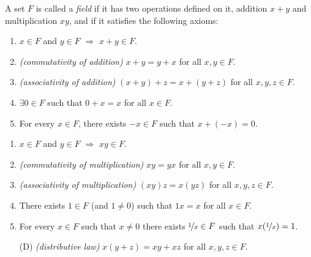 \documentclass[10pt,aspectratio=149]{beamer}
\begin{document}
\begin{frame}

\begin{definition}
A set $F$ is called a \emph{field} if it has two operations
defined on it, addition $x+y$ and multiplication $xy$, and if it satisfies
the following axioms:
\pause
\begin{enumerate}[({A}1)]
\item
$x \in F$ and $y \in F$ $\Rightarrow$ $x+y \in F$.
\pause
\item
\emph{(commutativity of addition)}
$x+y = y+x$ for all $x,y \in F$.
\pause
\item
\emph{(associativity of addition)}
$(x+y)+z = x+(y+z)$ for all $x,y,z \in F$.
\pause
\item
$\exists 0 \in F$ such that
$0+x = x$ for all $x \in F$.
\pause
\item
For every $x\in F$, there exists $-x \in F$
such that $x + (-x) = 0$.
\end{enumerate}
\begin{enumerate}[({M}1)]
\pause
\item
$x \in F$ and $y \in F$ $\Rightarrow$ $xy \in F$.
\pause
\item
\emph{(commutativity of multiplication)}
$xy = yx$ for all $x,y \in F$.
\pause
\item
\emph{(associativity of multiplication)}
$(xy)z = x(yz)$ for all $x,y,z \in F$.
\pause
\item
There exists $1 \in F$ (and $1 \not= 0$) such that
$1x = x$ for all $x \in F$.
\pause
\item
For every $x\in F$ such that $x \not= 0$ there exists
$\nicefrac{1}{x} \in F$
such that $x(\nicefrac{1}{x}) = 1$.
\pause
\item[(D)]
\emph{(distributive law)} $x(y+z) = xy+xz$
for all $x,y,z \in F$.
\end{enumerate}
\end{definition}

\end{frame}
\end{document}

